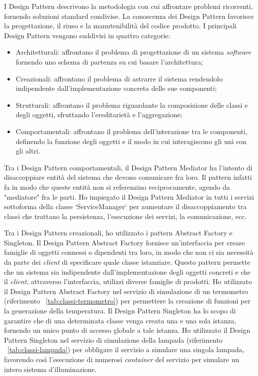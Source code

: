 I Design Pattern descrivono la metodologia con cui affrontare problemi ricorrenti, fornendo soluzioni standard condivise.
La conoscenza dei Design Pattern favorisce la progettazione, il riuso e la manutenibilità del codice prodotto.
I principali Design Pattern vengono suddivisi in quattro categorie:
\begin{itemize}
	\item Architetturali: affrontano il problema di progettazione di un sistema \emph{software} fornendo uno schema di partenza su cui basare l’architettura;
	\item Creazionali: affrontano il problema di astrarre il sistema rendendolo indipendente dall’implementazione concreta delle sue componenti;
	\item Strutturali: affrontano il problema riguardante la composizione delle classi e degli oggetti, sfruttando l’ereditarietà e l’aggregazione;
	\item Comportamentali: affrontano il problema dell’interazione tra le componenti, definendo la funzione degli oggetti e il modo in cui interagiscono gli uni con gli altri.
\end{itemize}

Tra i Design Pattern comportamentali, il Design Pattern Mediator ha l'intento di disaccoppiare entità del sistema che devono comunicare fra loro. Il pattern infatti fa in modo che queste entità non si referenzino reciprocamente, agendo da "mediatore" fra le parti.
Ho impiegato il Design Pattern Mediator in tutti i servizi sottoforma della classe `ServiceManager` per aumentare il disaccoppiamento tra classi che trattano la persistenza, l'esecuzione dei servizi, la comunicazione, ecc.

Tra i Design Pattern creazionali, ho utilizzato i pattern Abstract Factory e Singleton.
Il Design Pattern Abstract Factory fornisce un'interfaccia per creare famiglie di oggetti connessi o dipendenti tra loro, in modo che non ci sia necessità da parte dei \emph{client} di specificare quale classe istanziare. Questo pattern permette che un sistema sia indipendente dall'implementazione degli oggetti concreti e che il \emph{client}, attraverso l'interfaccia, utilizzi diverse famiglie di prodotti.
Ho utilizzato il Design Pattern Abstract Factory nel servizio di simulazione di un termometro (riferimento ~\ref{tab:classi-termometro}) per permettere la creazione di funzioni per la generazione della temperatura.
Il Design Pattern Singleton ha lo scopo di garantire che di una determinata classe venga creata una e una sola istanza, fornendo un unico punto di accesso globale a tale istanza.
Ho utilizzato il Design Pattern Singleton nel servizio di simulazione della lampada (riferimento ~\ref{tab:classi-lampada}) per obbligare il servizio a simulare una singola lampada, favorendo così l'esecuzione di numerosi \emph{container} del servizio per simulare un intero sistema d'illuminazione.


